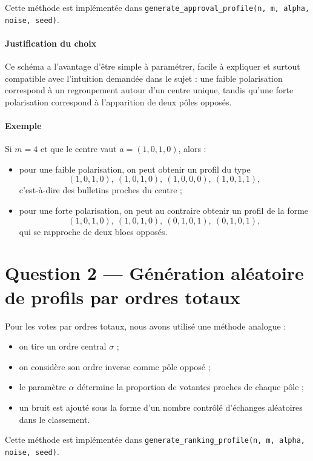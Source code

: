 \documentclass[11pt,a4paper]{article}
\begin{document}
Cette m\'ethode est impl\'ement\'ee dans \texttt{generate\_approval\_profile(n, m, alpha, noise, seed)}.

\paragraph{Justification du choix}
Ce sch\'ema a l'avantage d'\^etre simple \`a param\'etrer, facile \`a expliquer et surtout compatible avec l'intuition demand\'ee dans le sujet : une faible polarisation correspond \`a un regroupement autour d'un centre unique, tandis qu'une forte polarisation correspond \`a l'apparition de deux p\^oles oppos\'es.

\paragraph{Exemple}
Si \(m=4\) et que le centre vaut \(a=(1,0,1,0)\), alors :
\begin{itemize}[leftmargin=*]
    \item pour une faible polarisation, on peut obtenir un profil du type
    \[
    (1,0,1,0),\ (1,0,1,0),\ (1,0,0,0),\ (1,0,1,1),
    \]
    c'est-\`a-dire des bulletins proches du centre ;
    \item pour une forte polarisation, on peut au contraire obtenir un profil de la forme
    \[
    (1,0,1,0),\ (1,0,1,0),\ (0,1,0,1),\ (0,1,0,1),
    \]
    qui se rapproche de deux blocs oppos\'es.
\end{itemize}

\section{Question 2 --- G\'en\'eration al\'eatoire de profils par ordres totaux}

Pour les votes par ordres totaux, nous avons utilis\'e une m\'ethode analogue :
\begin{itemize}[leftmargin=*]
    \item on tire un ordre central \(\sigma\) ;
    \item on consid\`ere son ordre inverse comme p\^ole oppos\'e ;
    \item le param\`etre \(\alpha\) d\'etermine la proportion de votantes proches de chaque p\^ole ;
    \item un bruit est ajout\'e sous la forme d'un nombre contr\^ol\'e d'\'echanges al\'eatoires dans le classement.
\end{itemize}

Cette m\'ethode est impl\'ement\'ee dans \texttt{generate\_ranking\_profile(n, m, alpha, noise, seed)}.
\end{document}
